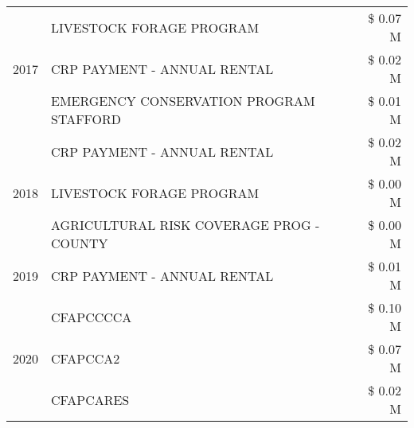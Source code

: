 \begin{tabular}{llr}
\cline{1-3}
\multirow[t]{3}{*}{2017} & LIVESTOCK FORAGE PROGRAM & \$ 0.07 M \\
 & CRP PAYMENT - ANNUAL RENTAL & \$ 0.02 M \\
 & EMERGENCY CONSERVATION PROGRAM STAFFORD & \$ 0.01 M \\
\cline{1-3}
\multirow[t]{3}{*}{2018} & CRP PAYMENT - ANNUAL RENTAL & \$ 0.02 M \\
 & LIVESTOCK FORAGE PROGRAM & \$ 0.00 M \\
 & AGRICULTURAL RISK COVERAGE PROG - COUNTY & \$ 0.00 M \\
\cline{1-3}
2019 & CRP PAYMENT - ANNUAL RENTAL & \$ 0.01 M \\
\cline{1-3}
\multirow[t]{3}{*}{2020} & CFAPCCCCA & \$ 0.10 M \\
 & CFAPCCA2 & \$ 0.07 M \\
 & CFAPCARES & \$ 0.02 M \\
\cline{1-3}
\bottomrule
\end{tabular}
